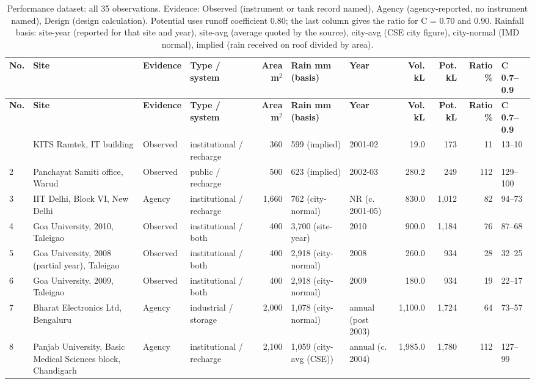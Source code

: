 {\scriptsize\setlength{\tabcolsep}{3pt}
\begin{longtable}{l p{2.7cm} l >{\raggedright\arraybackslash}p{1.6cm} r p{1.6cm} p{1.1cm} r r r l}
\caption{Performance dataset: all 35 observations. Evidence: Observed (instrument or tank record named), Agency (agency-reported, no instrument named), Design (design calculation). Potential uses runoff coefficient 0.80; the last column gives the ratio for C = 0.70 and 0.90. Rainfall basis: site-year (reported for that site and year), site-avg (average quoted by the source), city-avg (CSE city figure), city-normal (IMD normal), implied (rain received on roof divided by area).}\label{tab:perf}\\
\toprule
\textbf{No.} & \textbf{Site} & \textbf{Evidence} & \textbf{Type / system} & \textbf{Area m$^2$} & \textbf{Rain mm (basis)} & \textbf{Year} & \textbf{Vol. kL} & \textbf{Pot. kL} & \textbf{Ratio \%} & \textbf{C 0.7--0.9}\\ \midrule\endfirsthead
\toprule \textbf{No.} & \textbf{Site} & \textbf{Evidence} & \textbf{Type / system} & \textbf{Area m$^2$} & \textbf{Rain mm (basis)} & \textbf{Year} & \textbf{Vol. kL} & \textbf{Pot. kL} & \textbf{Ratio \%} & \textbf{C 0.7--0.9}\\ \midrule\endhead
\bottomrule\endfoot
1 & KITS Ramtek, IT building & Observed & institutional / recharge & 360 & 599 (implied) & 2001-02 & 19.0 & 173 & 11 & 13--10\\
2 & Panchayat Samiti office, Warud & Observed & public / recharge & 500 & 623 (implied) & 2002-03 & 280.2 & 249 & 112 & 129--100\\
3 & IIT Delhi, Block VI, New Delhi & Agency & institutional / recharge & 1,660 & 762 (city-normal) & NR (c. 2001-05) & 830.0 & 1,012 & 82 & 94--73\\
4 & Goa University, 2010, Taleigao & Observed & institutional / both & 400 & 3,700 (site-year) & 2010 & 900.0 & 1,184 & 76 & 87--68\\
5 & Goa University, 2008 (partial year), Taleigao & Observed & institutional / both & 400 & 2,918 (city-normal) & 2008 & 260.0 & 934 & 28 & 32--25\\
6 & Goa University, 2009, Taleigao & Observed & institutional / both & 400 & 2,918 (city-normal) & 2009 & 180.0 & 934 & 19 & 22--17\\
7 & Bharat Electronics Ltd, Bengaluru & Agency & industrial / storage & 2,000 & 1,078 (city-normal) & annual (post 2003) & 1,100.0 & 1,724 & 64 & 73--57\\
8 & Panjab University, Basic Medical Sciences block, Chandigarh & Agency & institutional / recharge & 2,100 & 1,059 (city-avg (CSE)) & annual (c. 2004) & 1,985.0 & 1,780 & 112 & 127--99\\

\end{longtable}}
